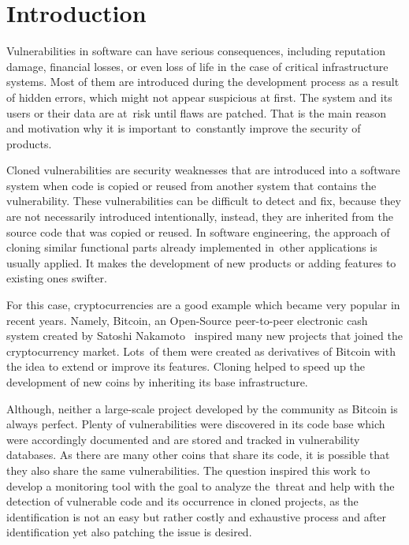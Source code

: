 
\chapter{Introduction}
  Vulnerabilities in software can have serious consequences, including reputation damage,
  financial losses, or even loss of life in the case of critical infrastructure systems. Most of them
  are introduced during the development process as a result of hidden errors, which might not appear
  suspicious at first. The system and its users or their data are at~risk until flaws are patched.
  That is the main reason and motivation why it is important to~constantly improve the security of products.

  Cloned vulnerabilities are security weaknesses that are introduced into a software system
  when code is copied or reused from another system that contains the vulnerability.
  These vulnerabilities can be difficult to detect and fix, because they are not necessarily introduced
  intentionally, instead, they are inherited from the source code that was copied or reused. In software
  engineering, the approach of cloning similar functional parts already implemented in~other applications
  is usually applied. It makes the development of new products or adding features to existing ones swifter.

  For this case, cryptocurrencies are a good example which became very popular in recent years.
  Namely, Bitcoin, an Open-Source peer-to-peer electronic cash system created by Satoshi Nakamoto~\cite{bitcoin}
  inspired many new projects that joined the cryptocurrency market. Lots~of them were created
  as derivatives of Bitcoin with the idea to extend or improve its features. Cloning helped to speed up
  the development of new coins by inheriting its base infrastructure.

  Although, neither a large-scale project developed by the community as Bitcoin is always perfect. Plenty of
  vulnerabilities were discovered in its code base which were accordingly documented and are stored
  and tracked in vulnerability databases. As there are many other coins that share its code, it is possible
  that they also share the same vulnerabilities. The question inspired this work to develop a monitoring tool
  with the goal to analyze the~threat and help with the detection of vulnerable code and its occurrence in
  cloned projects, as the identification is not an easy but rather costly and exhaustive process
  and after identification yet also patching the issue is desired.

